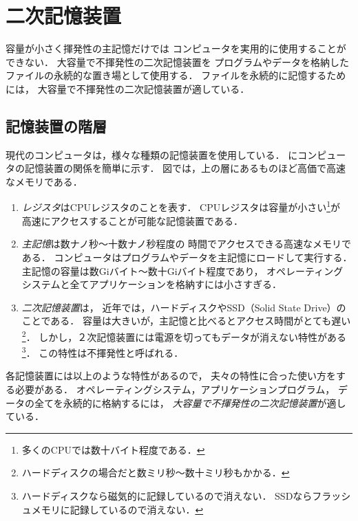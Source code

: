\chapter{二次記憶装置}

容量が小さく揮発性の主記憶だけでは
コンピュータを実用的に使用することができない．
大容量で不揮発性の二次記憶装置を
プログラムやデータを格納したファイルの永続的な置き場として使用する．
ファイルを永続的に記憶するためには，
大容量で不揮発性の二次記憶装置が適している．

\section{記憶装置の階層}
現代のコンピュータは，様々な種類の記憶装置を使用している．
にコンピュータの記憶装置の関係を簡単に示す．
図では，上の層にあるものほど高価で高速なメモリである．

\begin{enumerate}
\item \emph{レジスタ}はCPUレジスタのことを表す．
  CPUレジスタは容量が小さい\footnote{多くのCPUでは数十バイト程度である．}が
  高速にアクセスすることが可能な記憶装置である．

\item \emph{主記憶}は数ナノ秒〜十数ナノ秒程度の
  時間でアクセスできる高速なメモリである．
  コンピュータはプログラムやデータを主記憶にロードして実行する．
  主記憶の容量は数Giバイト〜数十Giバイト程度であり，
  オペレーティングシステムと全てアプリケーションを格納すには小さすぎる．

\item \emph{二次記憶装置}は，
  近年では，ハードディスクやSSD（Solid State Drive）のことである．
  容量は大きいが，主記憶と比べるとアクセス時間がとても遅い\footnote{
    ハードディスクの場合だと数ミリ秒〜数十ミリ秒もかかる．}．
  しかし，２次記憶装置には電源を切ってもデータが消えない特性がある\footnote{
    ハードディスクなら磁気的に記録しているので消えない．
    SSDならフラッシュメモリに記録しているので消えない．}．
  この特性は不揮発性と呼ばれる．
\end{enumerate}


各記憶装置には以上のような特性があるので，
夫々の特性に合った使い方をする必要がある．
オペレーティングシステム，アプリケーションプログラム，
データの全てを永続的に格納するには，
\emph{大容量で不揮発性の二次記憶装置}が適している．

